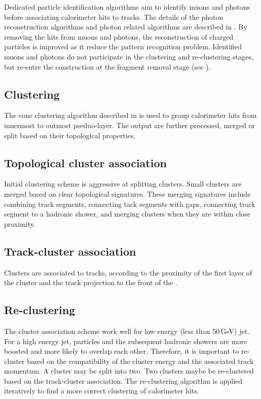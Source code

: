 Dedicated particle identification algorithms aim to identify muons and photons before associating calorimeter hits to tracks. The details of the photon reconstruction algorithms and photon related algorithms are described in . By removing the hits from muons and photons, the reconstruction of charged particles is improved as it reduce the pattern recognition problem. Identified muons and photons do not participate in the clustering and re-clustering stages, but re-entre the construction at the fragment removal stage (see ).

\subsection{Clustering}

The cone clustering algorithm described in  is used to group calorimeter hits from innermost to outmost pseduo-layer. The output \clusters are further processed, merged or split based on their topological properties.

\subsection{Topological cluster association}

Initial clustering scheme is aggressive at splitting clusters. Small clusters are merged  based on clear topological signatures. These merging signatures include combining track segments, connecting tack segments with gaps, connecting track segment to a hadronic shower, and merging clusters when they are within close proximity.

\subsection{Track-cluster association}

Clusters are associated to tracks, according to the proximity of the first layer of the cluster and the track projection to the front of the \ECAL.


\subsection{Re-clustering}

The cluster association scheme work well for low energy (less than 50\,GeV) jet. For a high energy jet, particles and the subsequent hadronic showers are more boosted and more likely to overlap each other. Therefore, it is important to re-cluster based on the compatibility of the cluster energy and the associated track momentum. A cluster may be split into two. Two clusters maybe be re-clustered based on the track-cluster association. The re-clustering algorithm is applied iteratively to find a more correct clustering of calorimeter hits.

